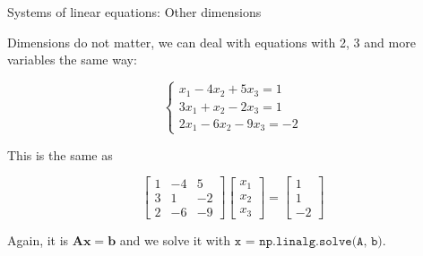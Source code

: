\documentclass{beamer}
\begin{document}
\begin{frame}{Systems of linear equations: Other dimensions}
	\begin{flushleft}
		
		Dimensions do not matter, we can deal with equations with 2, 3 and more variables the same way:
		
		\begin{equation}
			\begin{cases}
				x_1   - 4 x_2 + 5 x_3= 1 \\
				3 x_1 +   x_2 - 2 x_3= 1 \\ 
				2 x_1 - 6 x_2 - 9 x_3= -2 
			\end{cases}
		\end{equation}
		
		This is the same as
		
		\begin{equation}
			\begin{bmatrix}
				1   & -4 &  5  \\
				3   &  1 & -2  \\  
				2   & -6 & -9   
			\end{bmatrix}
			\begin{bmatrix}
				x_1  \\
				x_2  \\
				x_3 
			\end{bmatrix}
			=
			\begin{bmatrix}
				1  \\
				1   \\
				-2 
			\end{bmatrix}
		\end{equation}
		
		Again, it is $\mathbf{A} \mathbf{x} = \mathbf{b}$ and we solve it with $\texttt{x = np.linalg.solve(A, b)}$. 
	\end{flushleft}
\end{frame}
\end{document}
